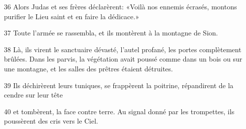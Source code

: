 36 Alors Judas et ses frères déclarèrent: «Voilà nos ennemis écrasés, montons purifier le Lieu saint et en faire la dédicace.»

37 Toute l’armée se rassembla, et ils montèrent à la montagne de Sion.

38 Là, ils virent le sanctuaire dévasté, l’autel profané, les portes complètement brûlées. Dans les parvis, la végétation avait poussé comme dans un bois ou sur une montagne, et les salles des prêtres étaient détruites.

39 Ils déchirèrent leurs tuniques, se frappèrent la poitrine, répandirent de la cendre sur leur tête

40 et tombèrent, la face contre terre. Au signal donné par les trompettes, ils poussèrent des cris vers le Ciel.

